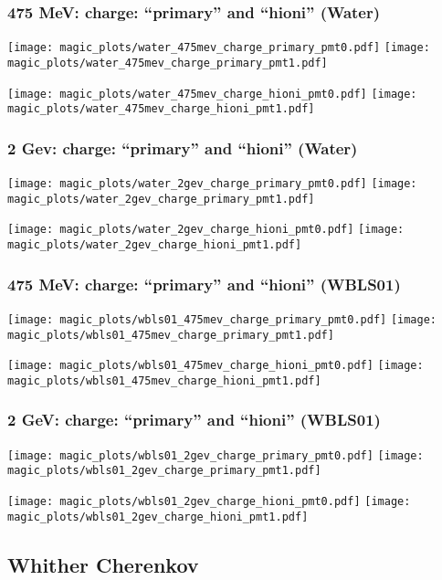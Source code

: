 \documentclass[xcolor=dvipsnames]{beamer}
\begin{document}
\begin{frame}[fragile]
  \frametitle{475 MeV: charge: ``primary'' and ``hioni'' (Water)}

\texttt{[image: magic\_plots/water\_475mev\_charge\_primary\_pmt0.pdf]}%
\texttt{[image: magic\_plots/water\_475mev\_charge\_primary\_pmt1.pdf]}%

\texttt{[image: magic\_plots/water\_475mev\_charge\_hioni\_pmt0.pdf]}%
\texttt{[image: magic\_plots/water\_475mev\_charge\_hioni\_pmt1.pdf]}%
\end{frame}
\begin{frame}[fragile]
  \frametitle{2 Gev: charge: ``primary'' and ``hioni'' (Water)}

\texttt{[image: magic\_plots/water\_2gev\_charge\_primary\_pmt0.pdf]}%
\texttt{[image: magic\_plots/water\_2gev\_charge\_primary\_pmt1.pdf]}%

\texttt{[image: magic\_plots/water\_2gev\_charge\_hioni\_pmt0.pdf]}%
\texttt{[image: magic\_plots/water\_2gev\_charge\_hioni\_pmt1.pdf]}%
\end{frame}


\begin{frame}[fragile]
  \frametitle{475 MeV: charge: ``primary'' and ``hioni'' (WBLS01)}

\texttt{[image: magic\_plots/wbls01\_475mev\_charge\_primary\_pmt0.pdf]}%
\texttt{[image: magic\_plots/wbls01\_475mev\_charge\_primary\_pmt1.pdf]}%

\texttt{[image: magic\_plots/wbls01\_475mev\_charge\_hioni\_pmt0.pdf]}%
\texttt{[image: magic\_plots/wbls01\_475mev\_charge\_hioni\_pmt1.pdf]}%
\end{frame}
\begin{frame}[fragile]
  \frametitle{2 GeV: charge: ``primary'' and ``hioni'' (WBLS01)}

\texttt{[image: magic\_plots/wbls01\_2gev\_charge\_primary\_pmt0.pdf]}%
\texttt{[image: magic\_plots/wbls01\_2gev\_charge\_primary\_pmt1.pdf]}%

\texttt{[image: magic\_plots/wbls01\_2gev\_charge\_hioni\_pmt0.pdf]}%
\texttt{[image: magic\_plots/wbls01\_2gev\_charge\_hioni\_pmt1.pdf]}%
\end{frame}

\subsection {Whither Cherenkov}
\end{document}
